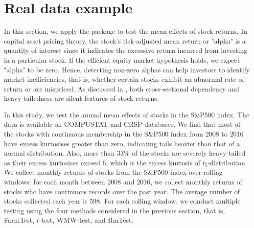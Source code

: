 \section{Real data example}\label{sec:real_data}


In this section, we apply the  package to test the mean effects of stock returns.  In capital asset pricing theory, the stock's risk-adjusted mean return or "alpha" is a quantity of interest since it indicates the excessive return incurred from investing in a particular stock. If the efficient equity market hypothesis holds, we expect "alpha" to be zero. Hence, detecting non-zero alphas can help investors to identify market inefficiencies, that is, whether certain stocks exhibit an abnormal rate of return or are mispriced. As discussed in \cite{C2001}, both cross-sectional dependency and heavy tailedness are silent features of stock returns. 


In this study, we test the annual mean effects of stocks in the S\&P500 index. The data is available on COMPUSTAT and CRSP databases. %
We find that most of  the stocks with continuous membership in the S\&P500 index from 2008 to 2016 have excess kurtosises greater than zero, indicating tails heavier than that of a normal distribution. 
Also, more than $33\%$ of the stocks are severely heavy-tailed as their excess kurtosises exceed 6, which is the excess kurtosis of $t_5$-distribution.
We collect monthly returns of stocks from the S\&P500 index over rolling windows: for each month between 2008 and 2016, we collect monthly returns of stocks who have continuous records over the past year. The average number of stocks collected each year is 598. For each rolling window, we conduct multiple testing using the four methods considered in the previous section, that is, FarmTest, $t$-test, WMW-test, and RmTest.


